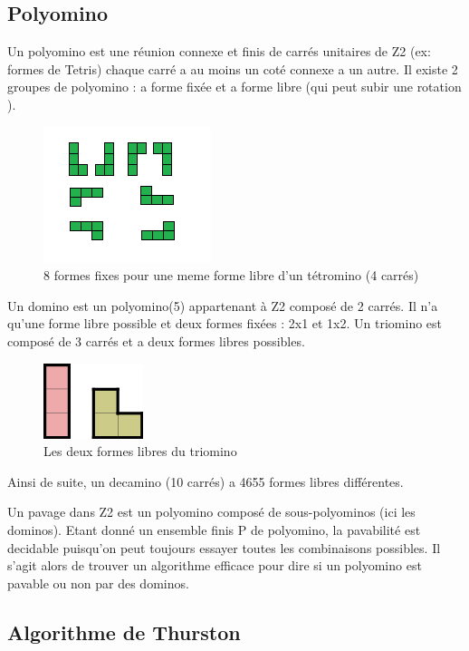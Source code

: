 \documentclass{article}
\begin{document}
\subsection{Polyomino}

Un polyomino est une réunion connexe et finis de carrés unitaires de Z2 (ex: formes de Tetris) chaque carré a au moins un coté connexe a un autre.
Il existe 2 groupes de polyomino : a forme fixée et a forme libre (qui peut subir une rotation ).

\begin{figure} [h]
    \center
    \includegraphics [scale=0.5] {image/polyomino_libre.png}
    \caption{8 formes fixes pour une meme forme libre d'un tétromino (4 carrés)}
\end{figure}

Un domino est un polyomino(5) appartenant à Z2 composé de 2 carrés. Il n’a qu’une forme libre possible et deux formes fixées : 2x1 et 1x2.
Un triomino est composé de 3 carrés et a deux formes libres possibles.

\begin{figure} [h]
    \center
    \includegraphics [scale=0.5] {image/triomino.png}
    \caption{Les deux formes libres du triomino}
\end{figure}

Ainsi de suite, un decamino (10 carrés) a 4655 formes libres différentes.

Un pavage dans Z2 est un polyomino composé de sous-polyominos (ici les dominos).
Etant donné un ensemble finis P de polyomino, la pavabilité est decidable puisqu'on peut toujours essayer toutes les combinaisons possibles.
Il s'agit alors de trouver un algorithme efficace pour dire si un polyomino est pavable ou non par des dominos.

\subsection{Algorithme de Thurston}
\end{document}
